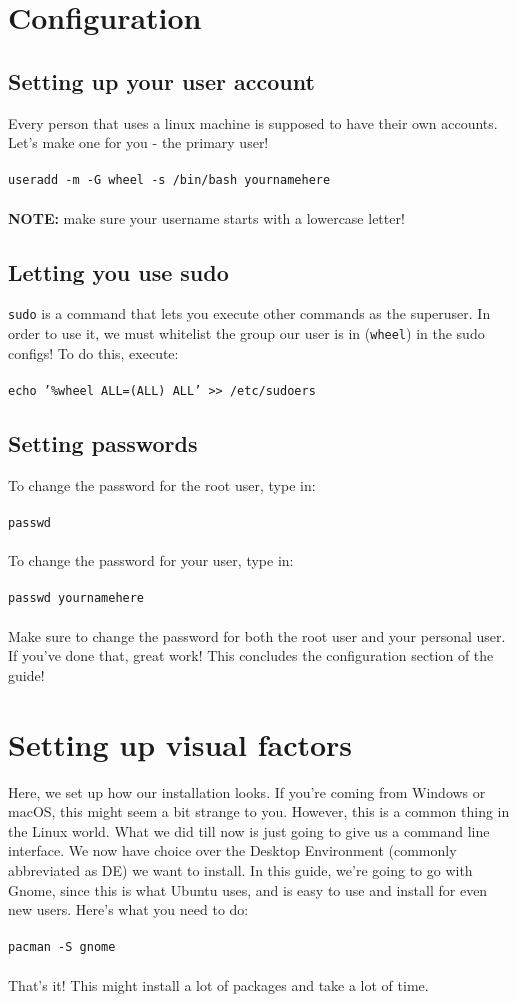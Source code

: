 \documentclass{article}
\begin{document}
\section{Configuration}
\subsection{Setting up your user account}
Every person that uses a linux machine is supposed to have their own accounts. Let's make one for you - the primary user!
\\\\
\texttt{useradd -m -G wheel -s /bin/bash yournamehere}
\\\\
\textbf{NOTE:} make sure your username starts with a lowercase letter!

\subsection{Letting you use sudo}
\texttt{sudo} is a command that lets you execute other commands as the superuser. In order to use it, we must whitelist the group our user is in (\texttt{wheel}) in the sudo configs! To do this, execute: 
\\\\
\texttt{echo '\%wheel ALL=(ALL) ALL' >> /etc/sudoers}

\subsection{Setting passwords}
To change the password for the root user, type in:
\\\\\texttt{passwd}\\\\
To change the password for your user, type in:
\\\\\texttt{passwd yournamehere}\\
\\Make sure to change the password for both the root user and your personal user. If you've done that, great work! This concludes the configuration section of the guide!

\section{Setting up visual factors}
Here, we set up how our installation looks. If you're coming from Windows or macOS, this might seem a bit strange to you. However, this is a common thing in the Linux world. What we did till now is just going to give us a command line interface. We now have choice over the Desktop Environment (commonly abbreviated as DE) we want to install. In this guide, we're going to go with Gnome, since this is what Ubuntu uses, and is easy to use and install for even new users. Here's what you need to do:
\\\\
\texttt{pacman -S gnome}
\\\\
That's it! This might install a lot of packages and take a lot of time. 
\end{document}

